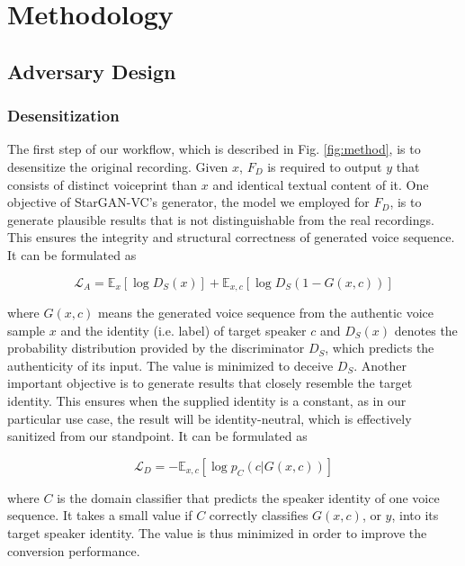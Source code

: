 \documentclass[journal]{IEEEtran} %
\begin{document}
\section{Methodology}
\label{seg:method}

\subsection{Adversary Design}

\subsubsection{Desensitization}

The first step of our workflow, which is described in Fig. \ref{fig:method}, is to desensitize the original recording. Given $x$, $F_D$ is required to output $y$ that consists of distinct voiceprint than $x$ and identical textual content of it. One objective of StarGAN-VC\cite{a3}'s generator, the model we employed for $F_D$, is to generate plausible results that is not distinguishable from the real recordings. This ensures the integrity and structural correctness of generated voice sequence. It can be formulated as

\begin{equation}
    \label{eqn:adv_loss}
    \mathcal{L}_A = \mathbb{E}_{x}[\log D_S(x)] + \mathbb{E}_{x, c}[\log D_S(1 - G(x, c))]
\end{equation}

where $G(x, c)$ means the generated voice sequence from the authentic voice sample $x$ and the identity (i.e. label) of target speaker $c$ and $D_S(x)$ denotes the probability distribution provided by the discriminator $D_S$, which predicts the authenticity of its input. The value is minimized to deceive $D_S$. Another important objective is to generate results that closely resemble the target identity. This ensures when the supplied identity is a constant, as in our particular use case, the result will be identity-neutral, which is effectively sanitized from our standpoint. It can be formulated as

\begin{equation}
    \label{eqn:dom_loss}
    \mathcal{L}_D = - \mathbb{E}_{x, c}[\log p_C(c | G(x, c))]
\end{equation}

where $C$ is the domain classifier that predicts the speaker identity of one voice sequence. It takes a small value if $C$ correctly classifies $G(x, c)$, or $y$, into its target speaker identity. The value is thus minimized in order to improve the conversion performance.
\end{document}
